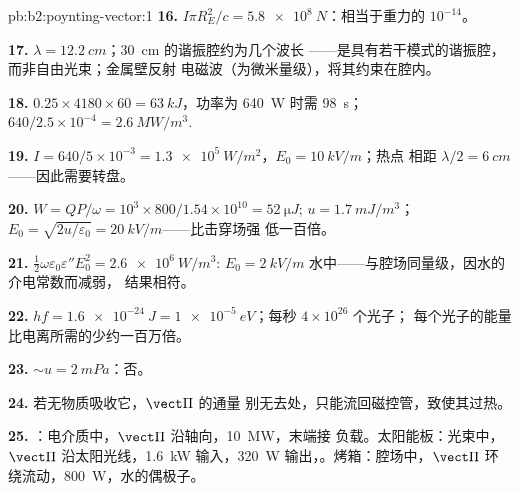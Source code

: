\begin{solution}{pb:b2:poynting-vector:1}
\textbf{16.} $I\pi R_E^2/c = \qty{5.8e8}{N}$：相当于重力的 $10^{-14}$。

\textbf{17.} $\lambda = \qty{12.2}{cm}$；\qty{30}{cm} 的谐振腔约为几个波长
——是具有若干模式的谐振腔，而非自由光束；金属壁反射
电磁波（为微米量级），将其约束在腔内。

\textbf{18.} $0.25 \times 4180 \times 60 = \qty{63}{kJ}$，功率为 \qty{640}{W} 时需 \qty{98}{s}；
$640/2.5 \times 10^{-4} = \qty{2.6}{MW/m^3}$.

\textbf{19.} $I = 640/5 \times 10^{-3} = \qty{1.3e5}{W/m^2}$，$E_0 = \qty{10}{kV/m}$；热点
相距 $\lambda/2 = \qty{6}{cm}$——因此需要转盘。

\textbf{20.} $W = QP/\omega = 10^3 \times 800/1.54 \times 10^{10} = \qty{52}{\micro J}$; $u =
\qty{1.7}{mJ/m^3}$；$E_0 = \sqrt{2u/\varepsilon_0} = \qty{20}{kV/m}$——比击穿场强
低一百倍。

\textbf{21.} $\tfrac12\omega\varepsilon_0\varepsilon''E_0^2 = \qty{2.6e6}{W/m^3}$: $E_0 = \qty{2}{kV/m}$
水中——与腔场同量级，因水的介电常数而减弱，
结果相符。

\textbf{22.} $hf = \qty{1.6e-24}{J} = \qty{1e-5}{eV}$；每秒 $4 \times 10^{26}$ 个光子；
每个光子的能量比电离所需的少约一百万倍。

\textbf{23.} $\sim u = \qty{2}{mPa}$：否。

\textbf{24.} 若无物质吸收它，$\vect\Pi$ 的通量
别无去处，只能流回磁控管，致使其过热。

\textbf{25.} ：电介质中，$\vect\Pi$ 沿轴向，\qty{10}{MW}，末端接
负载。太阳能板：光束中，$\vect\Pi$ 沿太阳光线，\qty{1.6}{kW}
输入，\qty{320}{W} 输出，。烤箱：腔场中，$\vect\Pi$
环绕流动，\qty{800}{W}，水的偶极子。
\end{solution}
